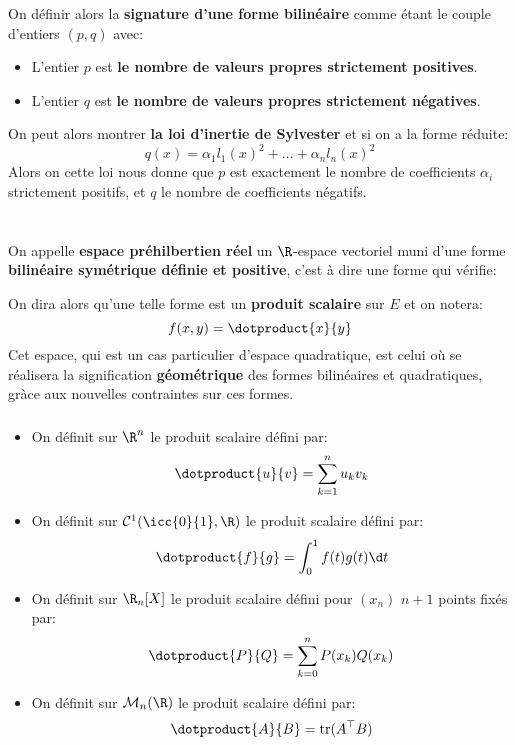 \subsection*{}
On définir alors la \textbf{signature d'une forme bilinéaire} comme étant le couple d'entiers \((p, q)\) avec:
\begin{itemize}
   \item L'entier \(p\) est \textbf{le nombre de valeurs propres strictement positives}.
   \item L'entier \(q\) est \textbf{le nombre de valeurs propres strictement négatives}.
\end{itemize}
On peut alors montrer \textbf{la loi d'inertie de Sylvester} et si on a la forme réduite:
\[
   q(x) = \alpha_1l_1(x)^2 + \ldots + \alpha_nl_n(x)^2
\]
Alors on cette loi nous donne que \(p\) est exactement le nombre de coefficients \(\alpha_i\) strictement positifs, et \(q\) le nombre de coefficients négatifs.
\chapter*{}
On appelle \textbf{espace préhilbertien réel} un \(\R\)-espace vectoriel muni d'une forme \textbf{bilinéaire symétrique définie et positive}, c'est à dire une forme qui vérifie:

On dira alors qu'une telle forme est un \textbf{produit scalaire} sur \(E\) et on notera:
\[
   f(x, y) = \dotproduct{x}{y}
\]
Cet espace, qui est un cas particulier d'espace quadratique, est celui où se réalisera la signification \textbf{géométrique} des formes bilinéaires et quadratiques, gràce aux nouvelles contraintes sur ces formes.
\subsection*{}
\begin{itemize}
   \item On définit sur \(\R^n\) le produit scalaire défini par:
   \[
      \dotproduct{u}{v} = \sum_{k=1}^{n} u_kv_k    
   \]
   \item On définit sur \(\mathcal{C}^1(\icc{0}{1}, \R)\) le produit scalaire défini par:
   \[
      \dotproduct{f}{g} = \int_{0}^{1} f(t)g(t) \d t    
   \]
   \item On définit sur \(\R_n[X]\) le produit scalaire défini pour \((x_n)\) \(n + 1\) points fixés par:
   \[
      \dotproduct{P}{Q} = \sum_{k=0}^{n}P(x_k)Q(x_k)
   \]   
   \item On définit sur \(\mathcal{M}_n(\R)\) le produit scalaire défini par:
   \[
      \dotproduct{A}{B} = \text{tr}(A^\top B)
   \]
\end{itemize}
